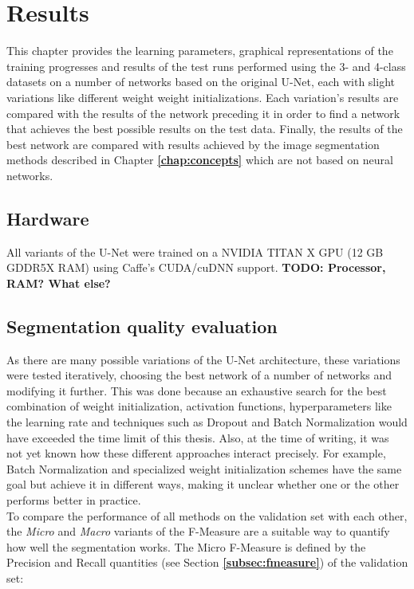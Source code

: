 \chapter {Results}
\label{chap:results}

This chapter provides the learning parameters, graphical representations of the training progresses and results of the test runs performed using the 3- and 4-class datasets on a number of networks based on the original U-Net, each with slight variations like different weight weight initializations. Each variation's results are compared with the results of the network preceding it in order to find a network that achieves the best possible results on the test data. Finally, the results of the best network are compared with results achieved by the image segmentation methods described in Chapter \textbf{\ref{chap:concepts}} which are not based on neural networks.

	\section{Hardware}
All variants of the U-Net were trained on a NVIDIA TITAN X GPU (12 GB GDDR5X RAM) using Caffe's CUDA/cuDNN support. \textbf{TODO: Processor, RAM? What else?}

	\section {Segmentation quality evaluation}

\noindent As there are many possible variations of the U-Net architecture, these variations were tested iteratively, choosing the best network of a number of networks and modifying it further. This was done because an exhaustive search for the best combination of weight initialization, activation functions, hyperparameters like the learning rate and techniques such as Dropout and Batch Normalization would have exceeded the time limit of this thesis. Also, at the time of writing, it was not yet known how these different approaches interact precisely. For example, Batch Normalization and specialized weight initialization schemes have the same goal but achieve it in different ways, making it unclear whether one or the other performs better in practice.\\

\noindent To compare the performance of all methods on the validation set with each other, the \textit{Micro} and \textit{Macro} variants of the F-Measure \cite{micromacro} are a suitable way to quantify how well the segmentation works. The Micro F-Measure is defined by the Precision and Recall quantities (see Section \textbf{\ref{subsec:fmeasure}}) of the validation set:

